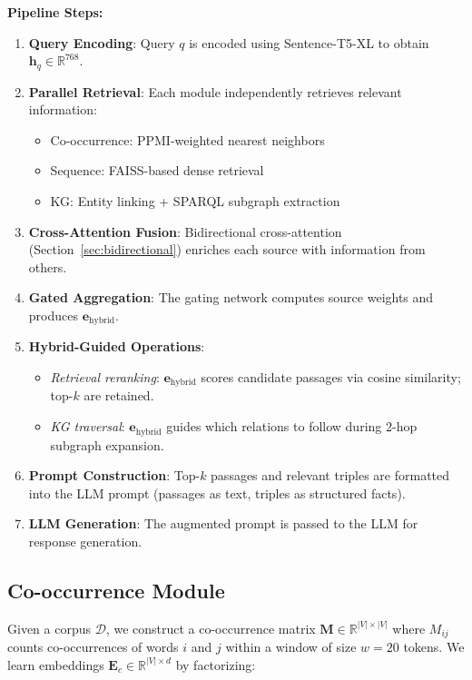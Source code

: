 \documentclass[10pt,twocolumn]{article}
\begin{document}
{\textbf{Pipeline Steps:}
\begin{enumerate}
    \item \textbf{Query Encoding}: Query $q$ is encoded using Sentence-T5-XL to obtain $\mathbf{h}_q \in \mathbb{R}^{768}$.
    \item \textbf{Parallel Retrieval}: Each module independently retrieves relevant information:
    \begin{itemize}
        \item Co-occurrence: PPMI-weighted nearest neighbors
        \item Sequence: FAISS-based dense retrieval
        \item KG: Entity linking + SPARQL subgraph extraction
    \end{itemize}
    \item \textbf{Cross-Attention Fusion}: Bidirectional cross-attention (Section~\ref{sec:bidirectional}) enriches each source with information from others.
    \item \textbf{Gated Aggregation}: The gating network computes source weights and produces $\mathbf{e}_{\text{hybrid}}$.
    \item \textbf{Hybrid-Guided Operations}:
    \begin{itemize}
        \item \textit{Retrieval reranking}: $\mathbf{e}_{\text{hybrid}}$ scores candidate passages via cosine similarity; top-$k$ are retained.
        \item \textit{KG traversal}: $\mathbf{e}_{\text{hybrid}}$ guides which relations to follow during 2-hop subgraph expansion.
    \end{itemize}
    \item \textbf{Prompt Construction}: Top-$k$ passages and relevant triples are formatted into the LLM prompt (passages as text, triples as structured facts).
    \item \textbf{LLM Generation}: The augmented prompt is passed to the LLM for response generation.
\end{enumerate}
}

\subsection{Co-occurrence Module}

Given a corpus $\mathcal{D}$, we construct a co-occurrence matrix $\mathbf{M} \in \mathbb{R}^{|V| \times |V|}$ where $M_{ij}$ counts co-occurrences of words $i$ and $j$ within a window of size $w=20$ tokens. We learn embeddings $\mathbf{E}_c \in \mathbb{R}^{|V| \times d}$ by factorizing:
\end{document}
